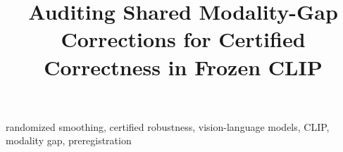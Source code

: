 \documentclass[conference]{IEEEtran}
\begin{document}
\title{Auditing Shared Modality-Gap Corrections for Certified Correctness in Frozen CLIP}

\author{
}

\maketitle

\begin{abstract}

\end{abstract}

\begin{IEEEkeywords}
randomized smoothing, certified robustness, vision-language models, CLIP, modality gap, preregistration
\end{IEEEkeywords}




















\appendices
\raggedbottom %



\clearpage %
\twocolumn %

\clearpage
\twocolumn %

\end{document}
